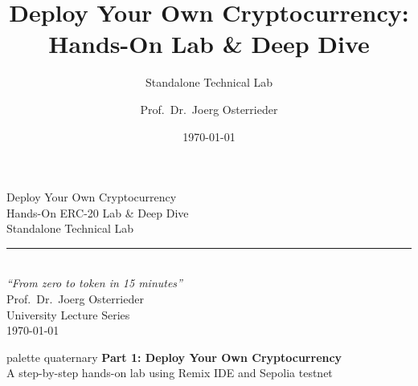 \documentclass[8pt,aspectratio=169]{beamer}
\title{Deploy Your Own Cryptocurrency: Hands-On Lab \& Deep Dive}
\subtitle{Standalone Technical Lab}
\author{Prof.~Dr.~Joerg Osterrieder}
\institute{University Lecture Series}
\date{\today}
\begin{document}
\begin{frame}[plain]
\vspace{2cm}
\begin{center}
{\Huge\color{mlpurple} Deploy Your Own Cryptocurrency}\\[0.4cm]
{\Large\color{mlblue} Hands-On ERC-20 Lab \& Deep Dive}\\[0.3cm]
{\normalsize Standalone Technical Lab}\\[0.3cm]
\textcolor{mlgray}{\rule{6cm}{0.4pt}}\\[0.3cm]
{\small\itshape ``From zero to token in 15 minutes''}\\[1.5cm]
{\normalsize Prof.~Dr.~Joerg Osterrieder}\\[0.2cm]
{\small University Lecture Series}\\[0.2cm]
{\small \today}
\end{center}
\end{frame}

\begin{frame}{}
\vfill
\begin{beamercolorbox}[sep=12pt,center,rounded=true,shadow=true]{palette quaternary}
{\Large\bfseries Part 1: Deploy Your Own Cryptocurrency}\\[6pt]
{\normalsize A step-by-step hands-on lab using Remix IDE and Sepolia testnet}
\end{beamercolorbox}
\vfill
\end{frame}
\end{document}
